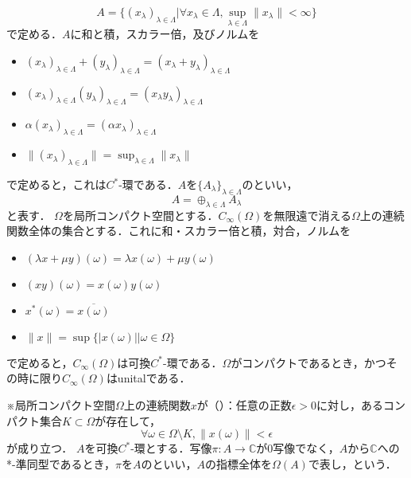 \[A=\{ \left( x_{\lambda}\right)_{\lambda \in \Lambda}|\forall x_{\lambda}\in \Lambda ,
\sup_{\lambda \in \Lambda}\lVert x_{\lambda}\rVert <\infty  \}\]
で定める．$A$に和と積，スカラー倍，及びノルムを
\begin{itemize}
\item $\left( x_{\lambda}\right)_{\lambda \in \Lambda}+\left( y_{\lambda}\right)_{\lambda \in \Lambda}
=\left( x_{\lambda}+y_{\lambda}\right)_{\lambda \in \Lambda}$
\item $\left( x_{\lambda}\right)_{\lambda \in \Lambda}\left( y_{\lambda}\right)_{\lambda \in \Lambda}
=\left( x_{\lambda}y_{\lambda}\right)_{\lambda \in \Lambda}$
\item $\alpha \left( x_{\lambda}\right)_{\lambda \in \Lambda}=\left( \alpha x_{\lambda}\right)_{\lambda \in \Lambda}$
\item $\lVert \left( x_{\lambda}\right)_{\lambda \in \Lambda}\rVert=\sup_{\lambda \in \Lambda}\lVert x_{\lambda}\rVert$
\end{itemize}
で定めると，これは$C^*$-環である．$A$を$\{A_{\lambda}\}_{\lambda \in \Lambda}$のといい，
\[A=\oplus_{\lambda \in \Lambda} A_{\lambda}\]
と表す．
$\Omega$を局所コンパクト空間とする．$C_{\infty}\left( \Omega\right)$を無限遠で消える$\Omega$上の連続関数全体の集合とする．これに和・スカラー倍と積，対合，ノルムを
\begin{itemize}
\item $\left(\lambda x+\mu y\right)\left(\omega\right)=\lambda x\left(\omega\right)+\mu y\left(\omega\right)$
\item $\left(xy\right)\left(\omega\right)=x\left(\omega\right)y\left(\omega\right)$
\item $x^*\left(\omega\right)=\overline{x\left(\omega\right)}$
\item $\lVert x\rVert=\sup\{|x\left(\omega\right)||\omega \in \Omega\}$
\end{itemize}
で定めると，$C_{\infty}(\Omega)$は可換$C^*$-環である．$\Omega$がコンパクトであるとき，かつその時に限り$C_{\infty}(\Omega)$はunitalである．

※局所コンパクト空間$\Omega$上の連続関数$x$が（）：任意の正数$\epsilon >0$に対し，あるコンパクト集合$K\subset \Omega$が存在して，
\[\forall \omega \in \Omega\setminus K,\lVert x(\omega)\rVert<\epsilon\]
が成り立つ．
$A$を可換$C^*$-環とする．写像$\pi:A\rightarrow\mathbb{C}$が0写像でなく，$A$から$\mathbb{C}$への *-準同型であるとき，$\pi$を$A$のといい，$A$の指標全体を$\Omega\left(A\right)$で表し，という．

